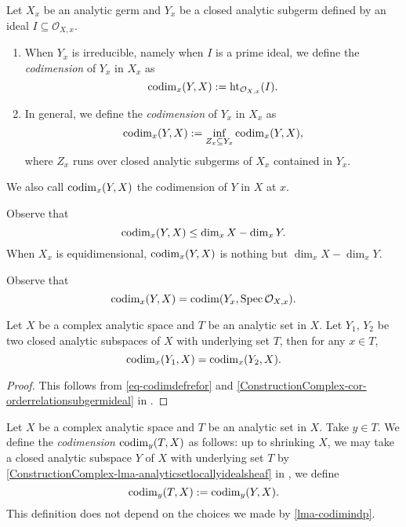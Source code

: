 \begin{definition}
    Let $X_x$ be an analytic germ and $Y_x$ be a closed analytic subgerm defined by an ideal $I\subseteq \mathcal{O}_{X,x}$.
    \begin{enumerate}
        \item When $Y_x$ is irreducible, namely when $I$ is a prime ideal, we define the \emph{codimension} of $Y_x$ in $X_x$ as 
            \[
                \operatorname{codim}_x(Y,X):=\operatorname{ht}_{\mathcal{O}_{X,x}}(I).    
            \]
        \item In general, we define the \emph{codimension} of $Y_x$ in $X_x$ as 
        \[
            \operatorname{codim}_x(Y,X):=\inf_{Z_x\subseteq Y_x} \operatorname{codim}_x(Y,X),
        \]
        where $Z_x$ runs over closed analytic subgerms of $X_x$ contained in $Y_x$.
    \end{enumerate}
    We also call $\operatorname{codim}_x(Y,X)$ the codimension of $Y$ in $X$ at $x$.
\end{definition}
Observe that 
\[
    \operatorname{codim}_x(Y,X)\leq \dim_x X-\dim_x Y.
\]
When $X_x$ is equidimensional, $\operatorname{codim}_x(Y,X)$ is nothing but $\dim_x X-\dim_x Y$.

Observe that 
\begin{equation}\label{eq-codimdefrefor}
    \operatorname{codim}_x(Y,X)=\operatorname{codim} (Y_x,\operatorname{Spec} \mathcal{O}_{X,x}).
\end{equation}

\begin{lemma}\label{lma-codimindp}
    Let $X$ be a complex analytic space and $T$ be an analytic set in $X$. Let $Y_1$, $Y_2$ be two closed analytic subspaces of $X$ with underlying set $T$, then for any $x\in T$,
    \[
        \operatorname{codim}_x(Y_1,X)=\operatorname{codim}_x(Y_2,X).
    \]
\end{lemma}
\begin{proof}
    This follows from \eqref{eq-codimdefrefor} and \cref{ConstructionComplex-cor-orderrelationsubgermideal} in .
\end{proof}

\begin{definition}
    Let  $X$ be a complex analytic space and $T$ be an analytic set in $X$. Take $y\in T$. We define the \emph{codimension} $\operatorname{codim}_y(T,X)$ as follows: up to shrinking $X$, we may take a closed analytic subspace $Y$ of $X$ with underlying set $T$ by \cref{ConstructionComplex-lma-analyticsetlocallyidealsheaf} in , we define 
    \[
        \operatorname{codim}_y(T,X):=\operatorname{codim}_y(Y,X).  
    \]
    This definition does not depend on the choices we made by \cref{lma-codimindp}.
\end{definition}

